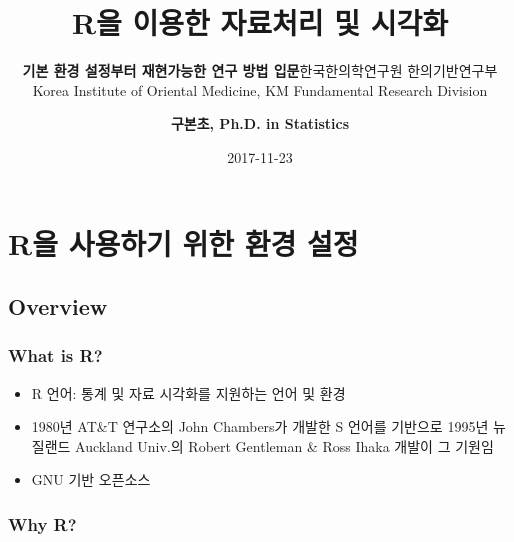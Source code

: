 \documentclass[12pt,a4paper]{book}
\title{\textbf{\LARGE R을 이용한 자료처리 및 시각화}}
\subtitle{\textbf{\Large 기본 환경 설정부터 재현가능한 연구 방법 입문}\vspace{2cm}\linebreak 한국한의학연구원
한의기반연구부\linebreak Korea Institute of Oriental Medicine, KM
Fundamental Research Division \vspace{2cm}}
\author{\textbf{\Large 구본초, Ph.D. in Statistics}}
\date{2017-11-23}
\begin{document}
\maketitle

{
\setcounter{tocdepth}{1}
\tableofcontents
}
\chapter{R을 사용하기 위한 환경 설정}\label{r----}

\section{Overview}\label{overview}

\subsection{What is R?}\label{what-is-r}

\begin{itemize}
\item
  R 언어: 통계 및 자료 시각화를 지원하는 언어 및 환경
\item
  1980년 AT\&T 연구소의 John Chambers가 개발한 S 언어를 기반으로 1995년
  뉴질랜드 Auckland Univ.의 Robert Gentleman \& Ross Ihaka 개발이 그
  기원임
\item
  GNU 기반 오픈소스
\end{itemize}

\subsection{Why R?}\label{why-r}
\end{document}
